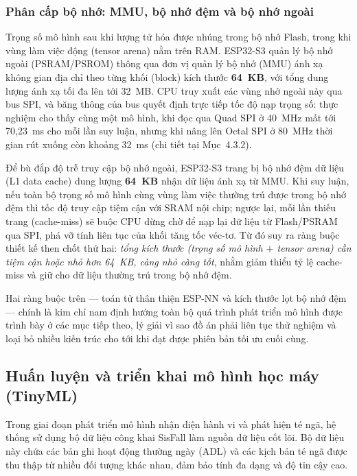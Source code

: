 \documentclass[../DoAn.tex]{subfiles}
\begin{document}
\subsubsection{Phân cấp bộ nhớ: MMU, bộ nhớ đệm và bộ nhớ ngoài}
Trọng số mô hình sau khi lượng tử hóa được nhúng trong bộ nhớ Flash, trong khi vùng làm việc động (tensor arena) nằm trên RAM. ESP32-S3 quản lý bộ nhớ ngoài (PSRAM/PSROM) thông qua đơn vị quản lý bộ nhớ (MMU) ánh xạ không gian địa chỉ theo từng khối (block) kích thước \textbf{64~KB}, với tổng dung lượng ánh xạ tối đa lên tới 32~MB. CPU truy xuất các vùng nhớ ngoài này qua bus SPI, và băng thông của bus quyết định trực tiếp tốc độ nạp trọng số: thực nghiệm cho thấy cùng một mô hình, khi đọc qua Quad SPI ở 40~MHz mất tới 70,23~ms cho mỗi lần suy luận, nhưng khi nâng lên Octal SPI ở 80~MHz thời gian rút xuống còn khoảng 32~ms (chi tiết tại Mục~4.3.2).

Để bù đắp độ trễ truy cập bộ nhớ ngoài, ESP32-S3 trang bị bộ nhớ đệm dữ liệu (L1 data cache) dung lượng \textbf{64~KB} nhận dữ liệu ánh xạ từ MMU. Khi suy luận, nếu toàn bộ trọng số mô hình cùng vùng làm việc thường trú được trong bộ nhớ đệm thì tốc độ truy cập tiệm cận với SRAM nội chip; ngược lại, mỗi lần thiếu trang (cache-miss) sẽ buộc CPU dừng chờ để nạp lại dữ liệu từ Flash/PSRAM qua SPI, phá vỡ tính liên tục của khối tăng tốc véc-tơ. Từ đó suy ra ràng buộc thiết kế then chốt thứ hai: \textit{tổng kích thước (trọng số mô hình $+$ tensor arena) cần tiệm cận hoặc nhỏ hơn 64~KB, càng nhỏ càng tốt}, nhằm giảm thiểu tỷ lệ cache-miss và giữ cho dữ liệu thường trú trong bộ nhớ đệm.

Hai ràng buộc trên --- toán tử thân thiện ESP-NN và kích thước lọt bộ nhớ đệm --- chính là kim chỉ nam định hướng toàn bộ quá trình phát triển mô hình được trình bày ở các mục tiếp theo, lý giải vì sao đồ án phải liên tục thử nghiệm và loại bỏ nhiều kiến trúc cho tới khi đạt được phiên bản tối ưu cuối cùng.

\subsection{Huấn luyện và triển khai mô hình học máy (TinyML)}
Trong giai đoạn phát triển mô hình nhận diện hành vi và phát hiện té ngã, hệ thống sử dụng bộ dữ liệu công khai SisFall làm nguồn dữ liệu cốt lõi. Bộ dữ liệu này chứa các bản ghi hoạt động thường ngày (ADL) và các kịch bản té ngã được thu thập từ nhiều đối tượng khác nhau, đảm bảo tính đa dạng và độ tin cậy cao.
\end{document}
